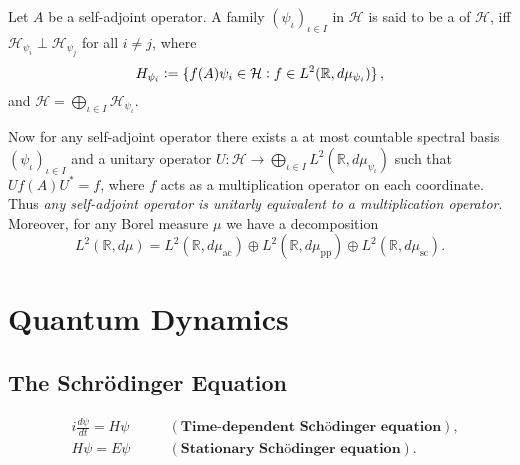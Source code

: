 \begin{definition}
	Let $A$ be a self-adjoint operator. A family $(\psi_\iota)_{\iota \in I}$ in $\mathcal{H}$ is said to be a  of $\mathcal{H}$, iff $\mathcal{H}_{\psi_i} \perp \mathcal{H}_{\psi_j}$ for all $i \neq j$, where
	\begin{equation*}
		H_{\psi_i} := \cbr[0]{f(A)\psi_i \in \mathcal{H} : f \in L^2(\mathbb{R},d\mu_{\psi_i})},
	\end{equation*}
	\noindent and $\mathcal{H} = \bigoplus_{\iota \in I} \mathcal{H}_{\psi_\iota}$.
\end{definition}

Now for any self-adjoint operator there exists a at most countable spectral basis $(\psi_\iota)_{\iota \in I}$ and a unitary operator $U : \mathcal{H} \to \bigoplus_{\iota \in I} L^2(\mathbb{R},d\mu_{\psi_\iota})$ such that $Uf(A)U^* = f$, where $f$ acts as a multiplication operator on each coordinate. Thus \emph{any self-adjoint operator is unitarly equivalent to a multiplication operator}.\\
Moreover, for any Borel measure $\mu$ we have a decomposition
\begin{equation*}
	L^2(\mathbb{R},d\mu) = L^2(\mathbb{R},d\mu_{\mathrm{ac}}) \oplus L^2(\mathbb{R},d\mu_{\mathrm{pp}}) \oplus L^2(\mathbb{R},d\mu_{\mathrm{sc}}).
\end{equation*} 

\section*{Quantum Dynamics}
\subsection*{The Schr\"odinger Equation}

\begin{align*}
	& i\frac{d\psi}{dt} = H\psi \qquad & \mathrm{(\textbf{Time-dependent Sch\"odinger equation})},\\
	& H\psi = E\psi &  \mathrm{(\textbf{Stationary Sch\"odinger equation})}.
\end{align*}

